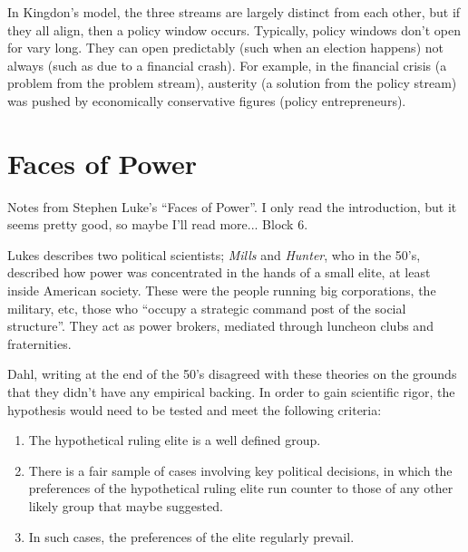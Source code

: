 
In Kingdon's model, the three streams are largely distinct from each
other, but if they all align, then a policy window occurs. Typically,
policy windows don't open for vary long. They can open predictably
(such when an election happens) not always (such as due to a financial
crash). For example, in the financial crisis (a problem from the
problem stream), austerity (a solution from the policy stream) was
pushed by economically conservative figures (policy entrepreneurs).


\section{Faces of Power}
\begin{flushright}
  \scriptsize Notes from Stephen Luke's ``Faces of Power''. I only
  read the introduction, but it seems pretty good, so maybe I'll read
  more... Block 6.
\end{flushright}

Lukes describes two political scientists; \textit{Mills} and
\textit{Hunter}, who in the 50's, described how power was concentrated
in the hands of a small elite, at least inside American society. These
were the people running big corporations, the military, etc, those who
``occupy a strategic command post of the social structure''. They act
as power brokers, mediated through luncheon clubs and fraternities.

Dahl, writing at the end of the 50's disagreed with these theories on
the grounds that they didn't have any empirical backing. In order to
gain scientific rigor, the hypothesis would need to be tested and
meet the following criteria:

\begin{enumerate}
  \item The hypothetical ruling elite is a well defined group.
  \item There is a fair sample of cases involving key political
    decisions, in which the preferences of the hypothetical ruling
    elite run counter to those of any other likely group that maybe
    suggested.
  \item In such cases, the preferences of the elite regularly prevail.
\end{enumerate}
  
